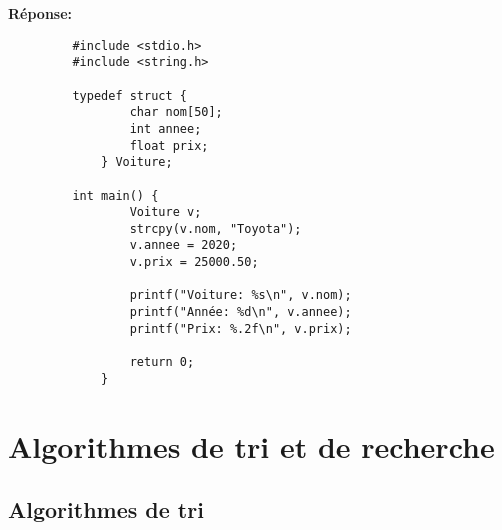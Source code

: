 \begin{enumerate}
	 \textbf{Réponse:}
	 \begin{lstlisting}
		 #include <stdio.h>
		 #include <string.h>
		
		 typedef struct {
			     char nom[50];
			     int annee;
			     float prix;
			 } Voiture;
		
		 int main() {
			     Voiture v;
			     strcpy(v.nom, "Toyota");
			     v.annee = 2020;
			     v.prix = 25000.50;
			
			     printf("Voiture: %s\n", v.nom);
			     printf("Année: %d\n", v.annee);
			     printf("Prix: %.2f\n", v.prix);
			
			     return 0;
			 }
		 \end{lstlisting}
\end{enumerate}

\section{Algorithmes de tri et de recherche}

\subsection{Algorithmes de tri}

